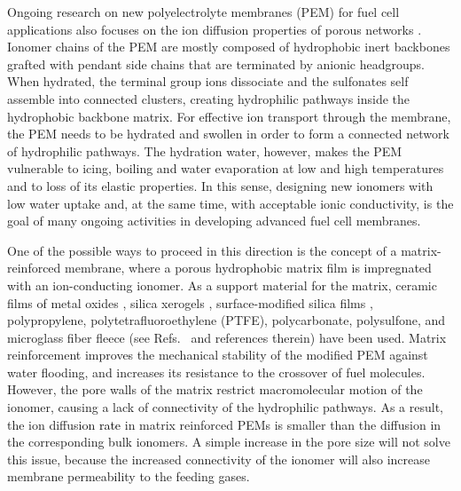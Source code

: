 \documentclass[3p,english,preprint]{elsarticle}
\newcommand{\need}[1]{\textcolor{black}{#1}}
\newcommand{\mage}[1]{\textcolor{black}{#1}}
\begin{document}
Ongoing research on new polyelectrolyte membranes (PEM) for 
fuel cell applications also focuses on the ion diffusion properties of porous networks
\cite{mauritz2004,gebel-2000,ioselevich,Gierke2}.
Ionomer chains of the PEM  are mostly composed of hydrophobic inert
 backbones grafted with pendant side  chains that are terminated by anionic headgroups.
When hydrated, the terminal group ions dissociate and the sulfonates self 
assemble into connected clusters, creating hydrophilic pathways inside 
the hydrophobic backbone matrix. 
For effective ion transport through the membrane, the PEM needs to 
be  hydrated and swollen in order to form a connected network  of hydrophilic pathways.  
The hydration water, however,  makes the 
PEM vulnerable to icing, boiling and water evaporation  at low and high temperatures
and  
to loss of its elastic properties. In this sense, designing  new
ionomers with low water uptake and, at the same time, with acceptable ionic conductivity, 
is the goal of many ongoing activities in developing advanced  fuel cell membranes.  

One of the possible ways to proceed in this direction is the  concept of 
a matrix-reinforced membrane, where a porous hydrophobic  matrix film is impregnated 
with an ion-conducting ionomer. As a support material for the  matrix, ceramic films
of metal oxides \cite{tejedor-2005,vichi-1999-ceramic-membrane}, 
silica xerogels  \cite{colomer-2003}, 
surface-modified silica films \cite{iacob-2016-ionome-in-nanopore}, 
polypropylene,  polytetrafluoroethylene (PTFE), polycarbonate,  polysulfone, and microglass
fiber fleece (see Refs.~\cite{liu-2003,rodgers-2008} and references therein)  have been used. 
Matrix reinforcement improves the mechanical stability of the 
modified PEM against water flooding, and increases its resistance to the crossover
of fuel molecules. 
However, the pore walls of the matrix  restrict  macromolecular motion of the ionomer,
 causing a lack of connectivity of the hydrophilic pathways. As a result, 
 the ion diffusion 
{\need{ 
rate
}}
   in  matrix reinforced PEMs is smaller than the diffusion in 
the corresponding bulk ionomers. A simple increase in 
the pore size will not solve this issue, because 
the increased connectivity of the ionomer will  also increase 
  membrane permeability to the feeding gases. 

\end{document}
